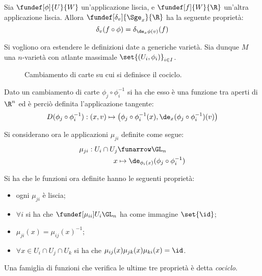 \begin{oss}
Sia $\fundef[\phi]{U}{W}$ un'applicazione liscia, e $\fundef[f]{W}{\R}$ un'altra applicazione liscia. Allora $\fundef[\delta_v]{\Sge_x}{\R}$ ha la seguente proprietà:
\begin{equation*}
\delta_v(f\circ \phi) = \delta_{\de_x\phi (v)}(f)
\end{equation*}
\end{oss}


Si vogliono ora estendere le definizioni date a generiche varietà.
Sia dunque $M$ una $n$-varietà con atlante massimale $\set{(U_i, \phi _i)}_{i\in I}$.

\begin{figure}
\centering

\caption{Cambiamento di carte su cui si definisce il cociclo.}
\end{figure}

\begin{oss}
Dato un cambiamento di carte $\phi _j \circ \phi _i ^{-1}$ si ha che esso è una funzione tra aperti di $\R ^n$ ed è perciò definita l'applicazione tangente:
\begin{equation*}
D(\phi _j \circ \phi _i ^{-1}): (x,v) \mapsto \big(\phi _j \circ \phi _i ^{-1}(x), \de_x(\phi _j \circ \phi _i ^{-1})(v)\big)
\end{equation*}
\end{oss}

Si considerano ora le applicazioni $\mu_{ji}$ definite come segue:
\begin{align*}
\mu_{ji} : U_i\cap U_j &\funarrow \GL_n \\
x &\mapsto \de_{\phi_i(x)} (\phi _j \circ \phi _i ^{-1})
\end{align*}

\begin{oss}
Si ha che le funzioni ora definite hanno le seguenti proprietà:
\begin{itemize}
\item ogni $\mu_{ji}$ è liscia;
\item $\forall i$ si ha che $\fundef[\mu_{ii}]{U_i}{\GL_n}$ ha come immagine $\set{\id}$;
\item $\mu_{ji}(x) = \mu_{ij}(x)^{-1}$;
\item $\forall x \in U_i\cap U_j\cap U_k$ si ha che $\mu_{ij}(x)\mu_{jk}(x)\mu_{ki}(x) = \id$.
\end{itemize}
Una famiglia di funzioni che verifica le ultime tre proprietà è detta \emph{cociclo}.
\end{oss}


\begin{epigraphs}	
\end{epigraphs}
